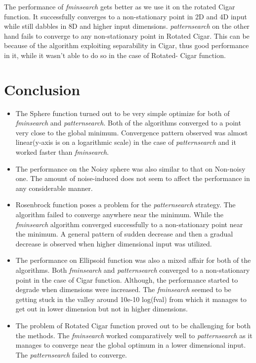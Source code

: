 The performance of \textit{fminsearch} gets better as we use it on the rotated Cigar function. It successfully converges to a non-stationary point in 2D and 4D input while still dabbles in 8D and higher input dimensions. \textit{patternsearch} on the other hand fails to converge to any non-stationary point in Rotated Cigar. This can be because of the algorithm exploiting separability in Cigar, thus good performance in it, while it wasn't able to do so in the case of Rotated- Cigar function.

\section{Conclusion}
\begin{itemize}
 \item The Sphere function turned out to be very simple optimize for both of \textit{fminsearch} and \textit{patternsearch}. Both of the algorithms converged to a point very close to the global minimum. Convergence pattern observed was almost linear(y-axis is on a logarithmic scale) in the case of \textit{patternsearch} and it worked faster than \textit{fminsearch}.
 \item  The performance on the Noisy sphere was also similar to that on Non-noisy one. The amount of noise-induced does not seem to affect the performance in any considerable manner. 
 \item  Rosenbrock function poses a problem for the \textit{patternsearch} strategy. The algorithm failed to converge anywhere near the minimum. While the \textit{fminsearch} algorithm converged successfully to a non-stationary point near the minimum. A general pattern of sudden decrease and then a gradual decrease is observed when higher dimensional input was utilized.
 
 \item  The performance on Ellipsoid function was also a mixed affair for both of the algorithms. Both \textit{fminsearch} and \textit{patternsearch} converged to a non-stationary point in the case of Cigar function. Although, the performance started to degrade when dimensions were increased. The \textit{fminsearch} seemed to be getting stuck in the valley around 10e-10 log(fval) from which it manages to get out in lower dimension but not in higher dimensions.
 
 \item The problem of Rotated Cigar function proved out to be challenging for both the methods. The \textit{fminsearch} worked comparatively well to \textit{patternsearch} as it manages to converge near the global optimum in a lower dimensional input. The \textit{patternsearch} failed to converge.
\end{itemize}
 
